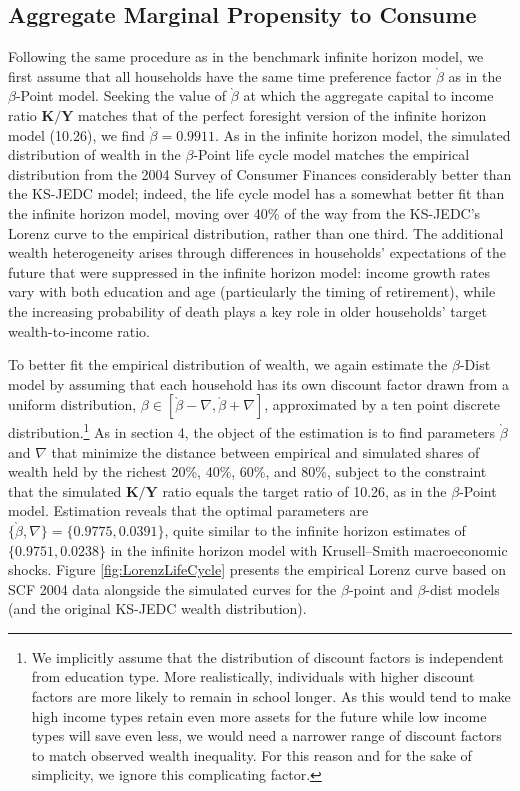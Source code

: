 \documentclass[11pt,a4paper,pdftex]{article}\usepackage[pdftex]{graphicx}\usepackage{epstopdf} \usepackage[pdftex]{hyperref}
\newcommand{\Discount}{\ensuremath{\beta}}
\newcommand{\KLev}{\ensuremath{\pmb{K}}}
\newcommand{\YLev}{\ensuremath{\pmb{Y}}}
\begin{document}
\subsection{Aggregate Marginal Propensity to Consume}

Following the same procedure as in the benchmark infinite horizon model, we first assume that all households have the same time preference factor $\grave{\Discount}$ as in the \Discount-Point model.  Seeking the value of $\grave{\Discount}$ at which the aggregate capital to income ratio $\KLev/\YLev$ matches that of the perfect foresight version of the infinite horizon model (10.26), we find $\grave{\Discount} = 0.9911$.  As in the infinite horizon model, the simulated distribution of wealth in the \Discount-Point life cycle model matches the empirical distribution from the 2004 Survey of Consumer Finances considerably better than the KS-JEDC model; indeed, the life cycle model has a somewhat better fit than the infinite horizon model, moving over 40\% of the way from the KS-JEDC's Lorenz curve to the empirical distribution, rather than one third.  The additional wealth heterogeneity arises through differences in households' expectations of the future that were suppressed in the infinite horizon model: income growth rates vary with both education and age (particularly the timing of retirement), while the increasing probability of death plays a key role in older households' target wealth-to-income ratio.

To better fit the empirical distribution of wealth, we again estimate the \Discount-Dist model by assuming that each household has its own discount factor drawn from a uniform distribution, $\Discount \in [\grave{\Discount} - \nabla,\grave{\Discount} + \nabla]$, approximated by a ten point discrete distribution.\footnote{We implicitly assume that the distribution of discount factors is independent from education type.  More realistically, individuals with higher discount factors are more likely to remain in school longer.  As this would tend to make high income types retain even more assets for the future while low income types will save even less, we would need a narrower range of discount factors to match observed wealth inequality.  For this reason and for the sake of simplicity, we ignore this complicating factor.}  As in section 4, the object of the estimation is to find parameters $\grave{\Discount}$ and $\nabla$ that minimize the distance between empirical and simulated shares of wealth held by the richest 20\%, 40\%, 60\%, and 80\%, subject to the constraint that the simulated $\KLev/\YLev$ ratio equals the target ratio of 10.26, as in the \Discount-Point model.  Estimation reveals that the optimal parameters are $\{\grave{\Discount},\nabla\} = \{0.9775, 0.0391\}$, quite similar to the infinite horizon estimates of $\{0.9751, 0.0238\}$ in the infinite horizon model with Krusell--Smith macroeconomic shocks.  Figure \ref{fig:LorenzLifeCycle} presents the empirical Lorenz curve based on SCF 2004 data alongside the simulated curves for the \Discount-point and \Discount-dist models (and the original KS-JEDC wealth distribution).%
\end{document}
